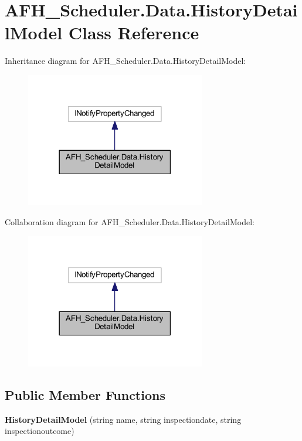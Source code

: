 \section{A\+F\+H\+\_\+\+Scheduler.\+Data.\+History\+Detail\+Model Class Reference}
\label{class_a_f_h___scheduler_1_1_data_1_1_history_detail_model}


Inheritance diagram for A\+F\+H\+\_\+\+Scheduler.\+Data.\+History\+Detail\+Model\+:
\nopagebreak
\begin{figure}[H]
\begin{center}
\leavevmode
\includegraphics[width=222pt]{class_a_f_h___scheduler_1_1_data_1_1_history_detail_model__inherit__graph}
\end{center}
\end{figure}


Collaboration diagram for A\+F\+H\+\_\+\+Scheduler.\+Data.\+History\+Detail\+Model\+:
\nopagebreak
\begin{figure}[H]
\begin{center}
\leavevmode
\includegraphics[width=222pt]{class_a_f_h___scheduler_1_1_data_1_1_history_detail_model__coll__graph}
\end{center}
\end{figure}
\subsection*{Public Member Functions}
\begin{DoxyCompactItemize}
\item 
\textbf{ History\+Detail\+Model} (string name, string inspectiondate, string inspectionoutcome)
\end{DoxyCompactItemize}
